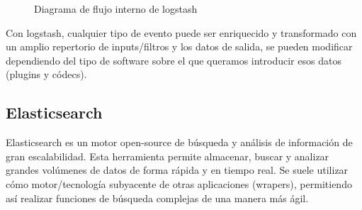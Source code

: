 \begin{figure}[H]
  \caption{Diagrama de flujo interno de logstash ~\cite{11}}
\end{figure}

Con logstash, cualquier tipo de evento puede ser enriquecido y transformado con un amplio repertorio de inputs/filtros y los datos de salida, se pueden modificar dependiendo del tipo de software sobre el que queramos introducir esos datos (plugins y códecs).\\

\subsection{Elasticsearch}
Elasticsearch es un motor open-source de búsqueda y análisis de información de gran escalabilidad. Esta herramienta permite almacenar, buscar y analizar grandes volúmenes de datos de forma rápida y en tiempo real. Se suele utilizar cómo motor/tecnología subyacente de otras aplicaciones (wrapers), permitiendo así realizar funciones de búsqueda complejas de una manera más ágil.\\

